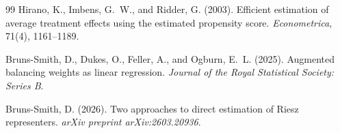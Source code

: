 \documentclass[11pt]{article}
\theoremstyle{definition}
\theoremstyle{plain}
\theoremstyle{remark}
\begin{document}
\begin{thebibliography}{99}
Hirano, K., Imbens, G.~W., and Ridder, G. (2003).
\newblock Efficient estimation of average treatment effects using the estimated propensity score.
\newblock \emph{Econometrica}, 71(4), 1161--1189.

Bruns-Smith, D., Dukes, O., Feller, A., and Ogburn, E.~L. (2025).
\newblock Augmented balancing weights as linear regression.
\newblock \emph{Journal of the Royal Statistical Society: Series B}.

Bruns-Smith, D. (2026).
\newblock Two approaches to direct estimation of Riesz representers.
\newblock \emph{arXiv preprint arXiv:2603.20936}.
\end{thebibliography}
\end{document}
